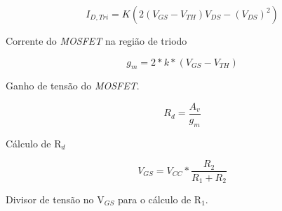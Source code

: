 \documentclass{article}
\begin{document}
\begin{eqfloat}
    \begin{equation}
        I_{D,Tri} = K(2(V_{GS} - V_{TH})V_{DS} - (V_{DS})^2 )
        \label{eq:corr_tri}
    \end{equation}
    \caption{Corrente do \emph{MOSFET} na região de triodo}
\end{eqfloat}

\begin{eqfloat}
    \begin{equation}
        g_m = 2 * k * (V_{GS} - V_{TH})
        \label{eq:gain_mos}
    \end{equation}
    \caption{Ganho de tensão do \emph{MOSFET}.}
\end{eqfloat}

\begin{eqfloat}
    \begin{equation}
        R_d = \frac{A_v}{g_m}
        \label{eq:calc_Rd}
    \end{equation}
    \caption{Cálculo de R$_d$}
\end{eqfloat}

\begin{eqfloat}
    \begin{equation}
        V_{GS} = V_{CC} * \frac{R_2}{R_1 + R_2}
        \label{eq:calc_R1}
    \end{equation}
    \caption{Divisor de tensão no V$_{GS}$ para o cálculo de R$_1$.}
\end{eqfloat}
\end{document}
